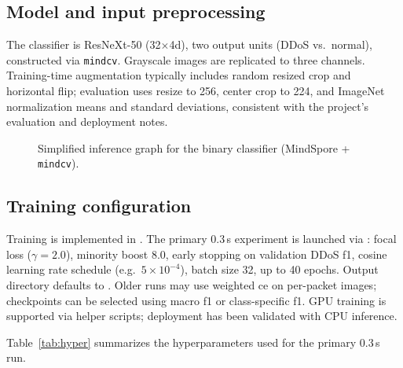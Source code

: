 \subsection{Model and input preprocessing}
The classifier is ResNeXt-50 (32$\times$4d), two output units (DDoS vs.\ normal),
constructed via \texttt{mindcv}. Grayscale images are replicated to three
channels. Training-time augmentation typically includes random resized crop and
horizontal flip; evaluation uses resize to 256, center crop to 224, and
ImageNet normalization means and standard deviations, consistent with the
project's evaluation and deployment notes.

\begin{figure}[ht]
  \centering
  \caption{Simplified inference graph for the binary classifier (MindSpore + \texttt{mindcv}).}
  \label{fig:modelhead}
\end{figure}

\subsection{Training configuration}
Training is implemented in . The primary
0.3\,s experiment is launched via :
focal loss ($\gamma=2.0$), minority boost 8.0, early stopping on validation DDoS
\gls{f1}, cosine learning rate schedule (e.g.\ $5\times10^{-4}$), batch size 32,
up to 40 epochs. Output directory defaults to
. Older runs may use weighted
\gls{ce} on per-packet images; checkpoints can be selected using macro \gls{f1}
or class-specific \gls{f1}. GPU training is supported via helper scripts;
deployment has been validated with CPU inference.

Table~\ref{tab:hyper} summarizes the hyperparameters used for the primary 0.3\,s run.

